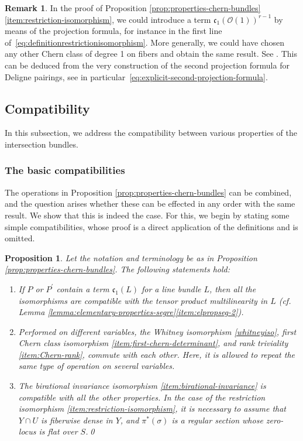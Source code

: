 \documentclass[11pt]{article}
\newcommand{\cf}{cf.\xspace}
\theoremstyle{plain}
\newtheorem{proposition}[theorem]{Proposition}
\theoremstyle{definition}
\newtheorem{remark}[theorem]{Remark}
\newcommand{\Ocal}{\mathcal O}
\newcommand{\cfrak}{\mathfrak c}
\begin{document}
\begin{remark}\label{rem:restriction-iso-chern-class-degree-1}
In the proof of Proposition \ref{prop:properties-chern-bundles}\eqref{item:restriction-isomorphism}, we could introduce a term $\cfrak_{1}(\Ocal(1))^{r-1}$ by means of the projection formula, for instance in the first line of~\eqref{eq:definitionrestrictionisomorphism}. More generally, we could have chosen any other Chern class of degree 1 on fibers and obtain the same result. See \cite[\textsection V.4.10]{Elkikfib}. This can be deduced from the very construction of the second projection formula for Deligne pairings, see in parti\-cu\-lar~\eqref{eq:explicit-second-projection-formula}.
\end{remark}

\subsection{Compatibility}\label{subsec:compatibility}
In this subsection, we address the compatibility between various properties of the intersection bundles.

\subsubsection{The basic compatibilities}\label{subsubsec:basic-compatibilites}
The operations in Proposition \ref{prop:properties-chern-bundles} can be combined, and the question arises whether these can be effected in any order with the same result. We show that this is indeed the case. For this, we begin by stating some simple compatibilities, whose proof is a direct application of the definitions and is omitted.

\begin{proposition}\label{prop:stupid-compatibilities}
Let the notation and terminology be as in Proposition \ref{prop:properties-chern-bundles}. The following statements hold:
\begin{enumerate}
\item If $P$ or $P^{\prime}$ contain a term $\cfrak_{1}(L)$ for a line bundle $L$, then all the isomorphisms are compatible with the tensor product multilinearity in $L$ (\cf Lemma \ref{lemma:elementary-properties-segre}\eqref{item:elpropseg-2}).
\item Performed on different variables, the Whitney isomorphism \eqref{whitneyiso}, first Chern class isomorphism \eqref{item:first-chern-determinant}, and rank triviality \eqref{item:Chern-rank}, commute with each other. Here, it is allowed to repeat the same type of operation on several variables.
\item\label{item:birational-comp} The birational invariance isomorphism \eqref{item:birational-invariance} is compatible with all the other properties. In the case of the restriction isomorphism \eqref{item:restriction-isomorphism}, it is necessary to assume that $Y \cap U$ is fiberwise dense in $Y$, and $\pi^{\ast}(\sigma)$ is a regular section whose zero-locus is flat over $S$.\qed
\end{enumerate}
\end{proposition}
\end{document}
